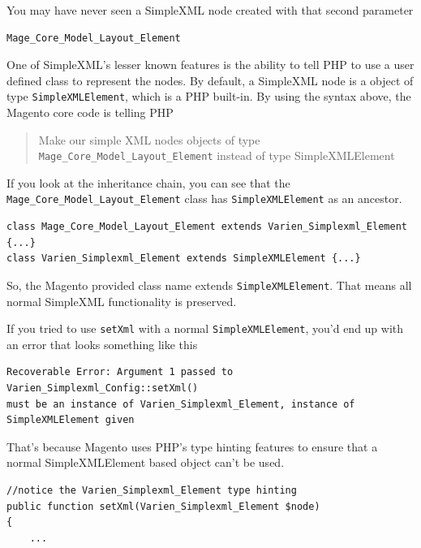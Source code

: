 \documentclass[oneside]{book}
\begin{document}
You may have never seen a SimpleXML node created with that second parameter

\begin{lstlisting}
Mage_Core_Model_Layout_Element

\end{lstlisting}


One of SimpleXML's lesser known features is the ability to tell PHP to use a user defined class to represent the nodes.  By default, a SimpleXML node is a object of type \footnotesize\texttt{SimpleXMLElement}\normalsize, which is a PHP built-in.  By using the syntax above, the Magento core code is telling PHP

\begin{quote}
Make our simple XML nodes objects of type \footnotesize\texttt{Mage\_Core\_Model\_Layout\_Element} \normalsize  instead of type SimpleXMLElement
\end{quote}

If you look at the inheritance chain, you can see that the \footnotesize\texttt{Mage\_Core\_Model\_Layout\_Element} \normalsize  class has \footnotesize\texttt{SimpleXMLElement} \normalsize  as an ancestor.

\begin{lstlisting}
class Mage_Core_Model_Layout_Element extends Varien_Simplexml_Element {...}
class Varien_Simplexml_Element extends SimpleXMLElement {...}

\end{lstlisting}


So, the Magento provided class name extends \footnotesize\texttt{SimpleXMLElement}\normalsize. That means all normal SimpleXML functionality is preserved.

If you tried to use \footnotesize\texttt{setXml} \normalsize  with a normal \footnotesize\texttt{SimpleXMLElement}\normalsize, you'd end up with an error that looks something like this

\begin{lstlisting}
Recoverable Error: Argument 1 passed to Varien_Simplexml_Config::setXml()
must be an instance of Varien_Simplexml_Element, instance of
SimpleXMLElement given

\end{lstlisting}


That's because Magento uses PHP's type hinting features to ensure that a normal SimpleXMLElement based object can't be used.

\begin{lstlisting}
//notice the Varien_Simplexml_Element type hinting
public function setXml(Varien_Simplexml_Element $node)
{
    ...

\end{lstlisting}
\end{document}
